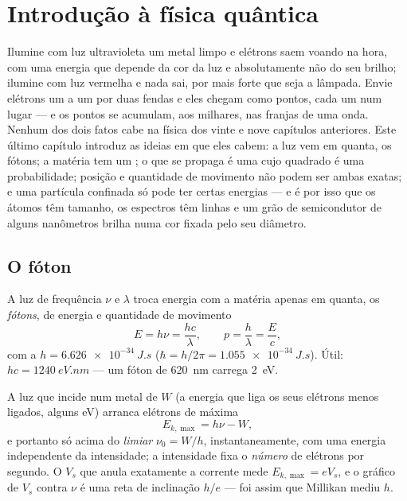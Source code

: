 \chapter{Introdução à física quântica}\label{ch:b1:quantum-introduction}

Ilumine com luz ultravioleta um metal limpo e elétrons saem voando na
hora, com uma energia que depende da cor da luz e absolutamente não do
seu brilho; ilumine com luz vermelha e nada sai, por mais forte que seja a
lâmpada. Envie elétrons um a um por duas fendas e eles chegam como pontos,
cada um num lugar --- e os pontos se acumulam, aos milhares, nas franjas de
uma onda. Nenhum dos dois fatos cabe na física dos vinte e nove capítulos
anteriores. Este último capítulo introduz as ideias em que eles cabem: a
luz vem em quanta, os fótons; a matéria tem um ; o que
se propaga é uma  cujo quadrado é uma probabilidade; posição e
quantidade de movimento não podem ser ambas exatas; e uma partícula
confinada só pode ter certas energias --- e é por isso que os átomos têm
tamanho, os espectros têm linhas e um grão de semicondutor de alguns
nanômetros brilha numa cor fixada pelo seu diâmetro.

\section{O fóton}

\begin{theorem}\label{thm:b1:quantum-introduction:photon}
A luz de frequência $\nu$ e  $\lambda$ troca energia com
a matéria apenas em quanta, os \emph{fótons}, de energia e quantidade de movimento
\[
E = h\nu = \frac{hc}{\lambda} , \qquad p = \frac{h}{\lambda} = \frac{E}{c} ,
\]
com a \emph{} $h = \qty{6.626e-34}{J.s}$ ($\hbar = h/2\pi =
\qty{1.055e-34}{J.s}$). Útil: $hc = \qty{1240}{eV.nm}$ --- um fóton de
\qty{620}{nm} carrega \qty{2}{eV}.
\end{theorem}
\admitted

\begin{proposition}\label{prop:b1:quantum-introduction:photoelectric}
A luz que incide num metal de \emph{} $W$ (a energia
que liga os seus elétrons menos ligados, alguns eV) arranca elétrons de
 máxima
\[
E_{k,\max} = h\nu - W ,
\]
e portanto só acima do \emph{limiar} $\nu_0 = W/h$, instantaneamente, com uma
energia independente da intensidade; a intensidade fixa o
\emph{número} de elétrons por segundo. O \emph{}
$V_s$ que anula exatamente a corrente mede $E_{k,\max} = eV_s$, e
o gráfico de $V_s$ contra $\nu$ é uma reta de inclinação $h/e$ --- foi assim que
Millikan mediu $h$.
\end{proposition}

